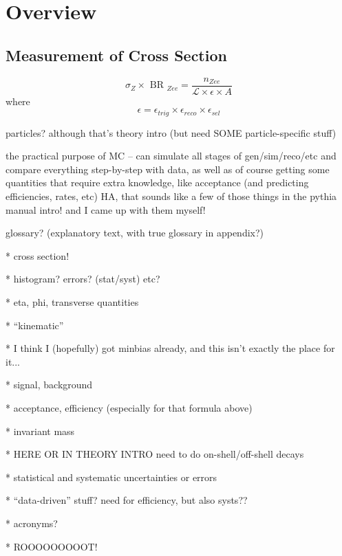 \chapter{Overview}
\label{over}
\section{Measurement of Cross Section}
\label{over:xsec}
\[
\sigma_{ Z } \times \textrm{ BR }_{ Zee } = \frac{ n_{ Zee } }{  \mathcal{ L } \times \epsilon \times A}
\]
where
\[
\epsilon = \epsilon_{ trig } \times \epsilon_{ reco } \times \epsilon_{ sel }
\]

particles?  although that's theory intro (but need SOME particle-specific stuff) 

the practical purpose of MC -- can simulate all stages of gen/sim/reco/etc and compare 
everything step-by-step with data, as well as of course getting some quantities 
that require extra knowledge, like acceptance (and predicting efficiencies, rates, etc)
HA, that sounds like a few of those things in the pythia manual intro!  and I came 
up with them myself!  

glossary? (explanatory text, with true glossary in appendix?)  

   * cross section!

   * histogram?  errors? (stat/syst) etc?

   * eta, phi, transverse quantities

   * ``kinematic''

   * I think I (hopefully) got minbias already, and this isn't exactly the place for it... 

   * signal, background

   * acceptance, efficiency (especially for that formula above)

   * invariant mass

   * HERE OR IN THEORY INTRO need to do on-shell/off-shell decays

   * statistical and systematic uncertainties or errors

   * ``data-driven'' stuff?  need for efficiency, but also systs??

   * acronyms?  

   * ROOOOOOOOOT!

